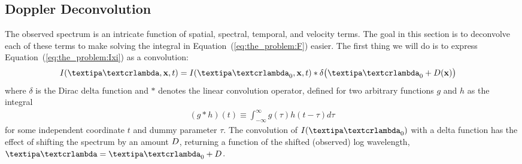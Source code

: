 \documentclass[modern]{aastex631}
\begin{document}
\subsection{Doppler Deconvolution}

The observed spectrum is an intricate function of spatial, spectral, temporal, and velocity terms. 
The goal in this section is to deconvolve each of these terms to make solving the integral in Equation~(\ref{eq:the_problem:F}) easier.
%
The first thing we will do is to express Equation~(\ref{eq:the_problem:Ixi}) as a convolution:
%
\begin{align}
    \label{eq:deconv:convolution}
    I(\lnlam, \x, t) & =
    I(\lnlam_0, \x, t)
    *
    \delta\big(\lnlam_0 + \D(\x)\big)
\end{align}
%
where $\delta$ is the Dirac delta function and $*$ denotes the linear convolution operator, defined for two arbitrary functions $g$ and $h$ as the integral
%
\begin{align}
    \label{eq:deconv:convolution_def}
    (g * h)(t) \equiv \int_{-\infty}^\infty g(\tau) h(t - \tau) d\tau
\end{align}
%
for some independent coordinate $t$ and dummy parameter $\tau$.
%
The convolution of $I(\lnlam_0)$ with a delta function has the effect of shifting the spectrum by an amount $D$, returning a function of the shifted (observed) log wavelength, $\lnlam = \lnlam_0 + \D$.
\end{document}
